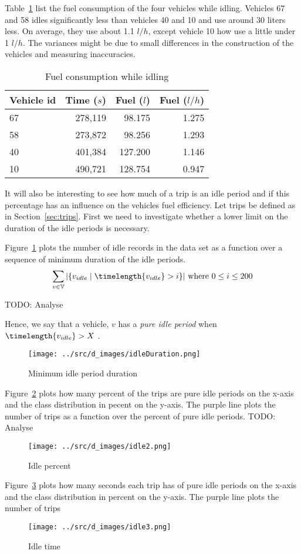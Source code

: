 Table~\ref{tb:idleFuelConsumption} list the fuel consumption of the four vehicles while idling.
Vehicles 67 and 58 idles significantly less than vehicles 40 and 10 and use around 30 liters less.
On average, they use about 1.1 $l/h$, except vehicle 10 how use a little under 1 $l/h$.
The variances might be due to small differences in the construction of the vehicles and measuring inaccuracies.
\begin{table}
\centering
\begin{tabular}{l|r|r|r}
Vehicle id & Time ($s$) & Fuel ($l$) &  Fuel ($l/h$)\\\hline
67 & 278,119 & 98.175 & 1.275\\\hline
58 & 273,872 & 98.256 & 1.293\\\hline
40 & 401,384 & 127.200 & 1.146\\\hline
10 & 490,721 & 128.754 & 0.947
\end{tabular}
\caption{Fuel consumption while idling}
\label{tb:idleFuelConsumption}
\end{table}

It will also be interesting to see how much of a trip is an idle period and if this percentage has an influence on the vehicles fuel efficiency.
Let trips be defined as in Section~\ref{sec:trips}.
First we need to investigate whether a lower limit on the duration of the idle periods is necessary.

Figure~\ref{fig:idleDuration} plots the number of idle records in the data set as a function over a sequence of minimum duration of the idle periods.
\[\sum_{v\in \mathbb{V}} | \{v_{idle}\mid\timelength{v_{idle}}> i\}| \mbox{ where } 0\leq i\leq 200\]

TODO: Analyse

Hence, we say that a vehicle, $v$ has a \textit{pure idle period} when $\timelength{v_{idle}}> X$ .
\begin{figure}[htb]%
\centering
\texttt{[image: ../src/d\_images/idleDuration.png]}
\caption{Minimum idle period duration}
\label{fig:idleDuration}
\end{figure}

Figure~\ref{fig:idlePercent} plots how many percent of the trips are pure idle periods on the x-axis and the class distribution in pecent on the y-axis. 
The purple line plots the number of trips as a function over the percent of pure idle periods.
TODO: Analyse
\begin{figure}[htb]%
\centering
\texttt{[image: ../src/d\_images/idle2.png]}
\caption{Idle percent}
\label{fig:idlePercent}
\end{figure}

Figure~\ref{fig:idleTime} plots how many seconds each trip has of pure idle periods on the x-axis and the class distribution in percent on the y-axis.
The purple line plots the number of trips 
\begin{figure}[htb]%
\centering
\texttt{[image: ../src/d\_images/idle3.png]}
\caption{Idle time}
\label{fig:idleTime}
\end{figure}
